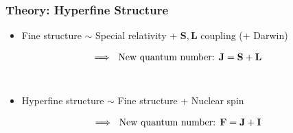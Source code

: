 \documentclass{beamer}
\theoremstyle{definition}
\begin{document}
\begin{frame}
\frametitle{Theory: Hyperfine Structure}


\begin{itemize}
	\item Fine structure $\sim$  Special relativity + $\mathbf{S},\mathbf{L}$ coupling (+ Darwin) 
	
	
	\begin{equation*}
	\hspace{-20 pt} \implies\text{ New quantum number: }
	\mathbf{J} = \mathbf{S} + \mathbf{L}
	\end{equation*}
	$\,$\\
	
	
	\item Hyperfine structure $\sim$ Fine structure + Nuclear spin 
	
	\begin{equation*}
	\hspace{-20 pt}\implies\text{ New quantum number: } 
	\mathbf{F} = \mathbf{J} + \mathbf{I}
	\end{equation*}
\end{itemize}

\end{frame}
\end{document}
